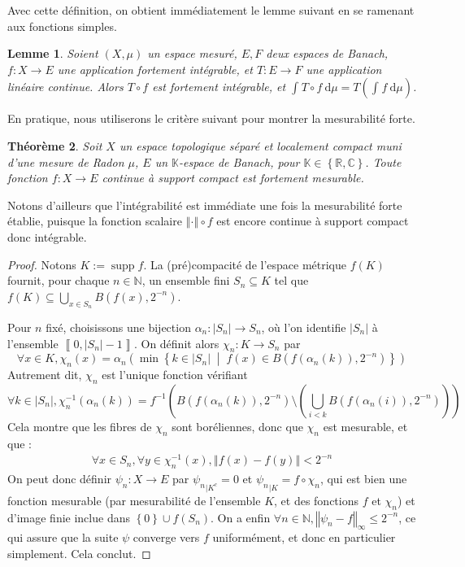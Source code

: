 \documentclass[a4paper,12pt]{article}
\newtheorem{theorem}{Théorème}[section]
\newtheorem{lemma}[theorem]{Lemme}
\newcommand{\R}{\mathbb{R}}
\newcommand{\N}{\mathbb{N}}
\newcommand{\C}{\mathbb{C}}
\newcommand{\K}{\mathbb{K}}
\newcommand{\norm}[1]{\left\Vert #1\right\Vert}
\newcommand{\abs}[1]{\left\vert#1\right\vert}
\newcommand{\card}[1]{\abs{#1}}
\newcommand{\set}[1]{\left\{ #1 \right\}}
\newcommand{\integral}[4]{\int_{#1}^{#2} #3~\mathrm{d}#4}
\newcommand{\tq}{\;\middle|\;}
\newcommand{\inv}{^{-1}}
\newcommand{\compl}{^c}
\newcommand{\comp}{\circ}
\DeclareMathOperator{\Supp}{supp}
\begin{document}
Avec cette définition, on obtient immédiatement le lemme suivant en se ramenant aux fonctions simples.

\begin{lemma}\label{Bochner_clm}
    Soient $(X, \mu)$ un espace mesuré, $E, F$ deux espaces de Banach, $f:X\to E$ une application
    fortement intégrable, et $T:E\to F$ une application linéaire continue. Alors $T\comp f$ est 
    fortement intégrable, et $\integral{}{}{T\comp f}{\mu} = T\left(\integral{}{}{f}{\mu}\right)$.
\end{lemma}

En pratique, nous utiliserons le critère suivant pour montrer la mesurabilité forte.

\begin{theorem}\label{strong_measurable_crit}
    Soit $X$ un espace topologique séparé et localement compact muni d'une mesure de Radon $\mu$,
    $E$ un $\K$-espace de Banach, pour $\K\in\set{\R, \C}$. Toute fonction $f:X\to E$ continue à support compact est
    fortement mesurable.
\end{theorem}

Notons d'ailleurs que l'intégrabilité est immédiate une fois la mesurabilité forte établie, 
puisque la fonction scalaire $\norm{\cdot}\comp f$ est encore continue à support compact donc intégrable.

\begin{proof}
    Notons $K:=\Supp f$. La (pré)compacité de l'espace métrique $f(K)$ fournit, 
    pour chaque $n\in\N$, un ensemble fini $S_n\subseteq K$ tel que $f(K)\subseteq\bigcup_{x\in S_n}B(f(x), 2^{-n})$.

    Pour $n$ fixé, choisissons une bijection $\alpha_n : \card{S_n} \to S_n$, où l'on identifie $\card{S_n}$ à l'ensemble 
    $\left\llbracket0, \card{S_n}-1\right\rrbracket$. On définit alors $\chi_n:K\to S_n$ par
    \begin{equation*}
        \forall x\in K, \chi_n(x)=\alpha_n\left(\min\set{k\in\card{S_n}\tq f(x)\in B(f(\alpha_n(k)), 2^{-n})}\right)
    \end{equation*}
    Autrement dit, $\chi_n$ est l'unique fonction vérifiant 
    \begin{equation*}
        \forall k\in\card{S_n}, \chi_n\inv(\alpha_n(k)) = f\inv\left(B(f(\alpha_n(k)), 2^{-n})\setminus\left(\bigcup_{i<k}B(f(\alpha_n(i)), 2^{-n})\right)\right)
    \end{equation*}
    Cela montre que les fibres de $\chi_n$ sont boréliennes, donc que $\chi_n$ est mesurable, et que :
    \begin{align*}
        \forall x\in S_n, \forall y\in\chi_n\inv(x), \norm{f(x)-f(y)}<2^{-n}
    \end{align*}
    On peut donc définir $\psi_n : X\to E$ par ${\psi_n}_{|K\compl}=0$ et ${\psi_n}_{|K}=f\comp\chi_n$, qui est bien une fonction 
    mesurable (par mesurabilité de l'ensemble $K$, et des fonctions $f$ et $\chi_n$) et d'image finie 
    inclue dans $\set{0}\cup f(S_n)$. On a enfin 
    $\forall n\in\N, \norm{\psi_n - f}_\infty \le 2^{-n}$, ce qui assure que la suite $\psi$ converge vers $f$ uniformément, 
    et donc en particulier simplement. Cela conclut.
\end{proof}
\end{document}
